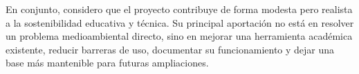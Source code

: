 En conjunto, considero que el proyecto contribuye de forma modesta pero realista a la sostenibilidad educativa y técnica. Su principal aportación no está en resolver un problema medioambiental directo, sino en mejorar una herramienta académica existente, reducir barreras de uso, documentar su funcionamiento y dejar una base más mantenible para futuras ampliaciones.

